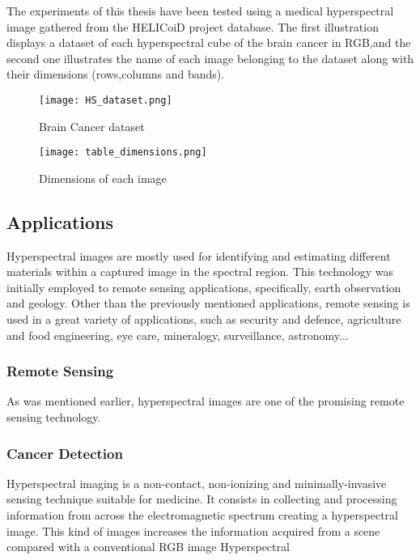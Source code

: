   The experiments of this thesis have been tested using a medical hyperspectral image gathered from the HELICoiD project database. The first illustration displays a dataset of each hyperspectral cube of the brain cancer in RGB,and the second one illustrates the name of each image belonging to the dataset along with their dimensions (rows,columns and bands).
  
  
   \begin{figure}[H]
        \texttt{[image: HS\_dataset.png]}        
        \centering    
        \caption{Brain Cancer dataset}
        \label{fig:systemArch}
    \end{figure}
    
    
   \begin{figure}[H]
        \texttt{[image: table\_dimensions.png]}        
        \centering    
        \caption{Dimensions of each image}
        \label{fig:systemArch}
    \end{figure}
     
   \subsection{Applications} 
    Hyperspectral images are mostly used for identifying and estimating different materials within a captured image in the spectral region.
    This technology was initially employed to remote sensing applications, specifically, earth observation and geology. Other than the previously mentioned applications, remote sensing is used in a great variety of applications, such as security and defence, agriculture and food engineering, eye care, mineralogy, surveillance, astronomy... 
    
    
   \subsubsection{Remote Sensing} 

As was mentioned earlier, hyperspectral images are one of the promising remote sensing technology. 

  \subsubsection{Cancer Detection} 

Hyperspectral imaging is a non-contact, non-ionizing and minimally-invasive sensing technique suitable for medicine. It consists in collecting and processing information from across the electromagnetic spectrum creating a hyperspectral image. This kind of images increases the information acquired from a scene compared with a conventional RGB image
Hyperspectral        	
         	
